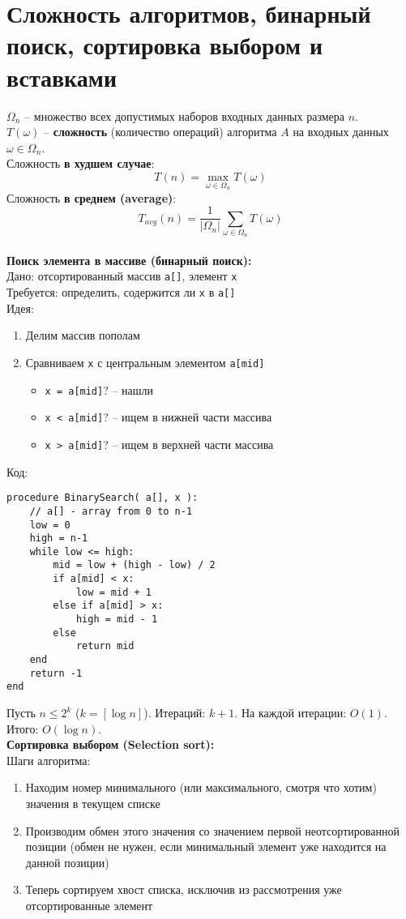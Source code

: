 \section {Сложность алгоритмов, бинарный поиск, сортировка выбором и вставками}
 $\Omega_{n}$ – множество всех допустимых наборов входных данных размера $n$.\\
$T(\omega)$ – {\bf сложность} (количество операций) алгоритма $A$ на входных данных $\omega \in \Omega_{n}$.\\
Сложность {\bf в худшем случае}:
$$
  T(n) = \max\limits_{\omega \in \Omega_{n}}T(\omega)
$$
Сложность {\bf в среднем (average)}:
$$
  T_{avg}(n) = \frac{1}{|\Omega_{n}|}\sum\limits_{\omega \in \Omega_{n}}T(\omega)
$$
\\
{\bf Поиск элемента в массиве (бинарный поиск):}\\
Дано: отсортированный массив \texttt{a[]}, элемент \texttt{x}\\
Требуется: определить, содержится ли \texttt{x} в \texttt{a[]}\\
Идея:
\begin{enumerate}
\item Делим массив пополам
\item Сравниваем \texttt{x} с центральным элементом \texttt{a[mid]}
\begin{itemize}
\item \texttt{x = a[mid]}? – нашли
\item \texttt{x < a[mid]}? – ищем в нижней части массива
\item \texttt{x > a[mid]}? – ищем в верхней части массива
\end{itemize}
\end{enumerate}
Код:\\
\begin{verbatim}
procedure BinarySearch( a[], x ):
    // a[] - array from 0 to n-1
    low = 0
    high = n-1
    while low <= high:
        mid = low + (high - low) / 2
        if a[mid] < x:
            low = mid + 1
        else if a[mid] > x:
            high = mid - 1
        else
            return mid
    end
    return -1
end
\end{verbatim}
Пусть $n \le 2^k$ ($k = [\log n]$). Итераций: $k + 1$. На каждой итерации: $O(1)$. Итого:
$O(\log n)$.\\
{\bf Сортировка выбором (Selection sort):}\\
Шаги алгоритма:
\begin{enumerate}
\item Находим номер минимального (или максимального, смотря что хотим) значения в текущем списке
\item Производим обмен этого значения со значением первой неотсортированной позиции (обмен не нужен, если минимальный элемент уже находится на данной позиции)
\item Теперь сортируем хвост списка, исключив из рассмотрения уже отсортированные элемент
\end{enumerate}
